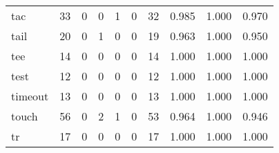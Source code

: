 \begin{longtable}{lp{2.0cm}p{2.0cm}p{2.0cm}p{2.0cm}p{2.0cm}p{2.0cm}p{2.0cm}p{2.0cm}p{2.0cm}}
tac       &                     33 &                                             0 &                                            0 &                                           1 &                                            0 &                                         32 &                                0.985 &                                  1.000 &                                0.970 \\
tail      &                     20 &                                             0 &                                            1 &                                           0 &                                            0 &                                         19 &                                0.963 &                                  1.000 &                                0.950 \\
tee       &                     14 &                                             0 &                                            0 &                                           0 &                                            0 &                                         14 &                                1.000 &                                  1.000 &                                1.000 \\
test      &                     12 &                                             0 &                                            0 &                                           0 &                                            0 &                                         12 &                                1.000 &                                  1.000 &                                1.000 \\
timeout   &                     13 &                                             0 &                                            0 &                                           0 &                                            0 &                                         13 &                                1.000 &                                  1.000 &                                1.000 \\
touch     &                     56 &                                             0 &                                            2 &                                           1 &                                            0 &                                         53 &                                0.964 &                                  1.000 &                                0.946 \\
tr        &                     17 &                                             0 &                                            0 &                                           0 &                                            0 &                                         17 &                                1.000 &                                  1.000 &                                1.000 \\

\end{longtable}
